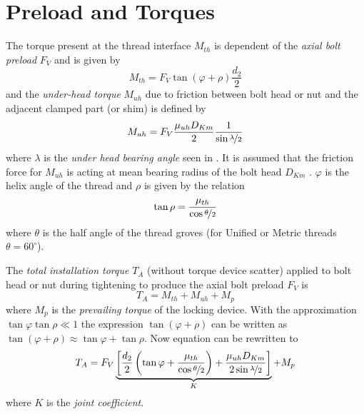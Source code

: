 \section{Preload and Torques}
\label{sec:preload}
The torque present at the thread interface $M_{th}$ is dependent of the \emph{axial bolt preload} $F_V$ 
and is given by
\begin{equation}
  M_{th} = F_V \tan(\varphi+\rho)\frac{d_2}{2}
  \label{equ:M_th}
\end{equation}
and the \emph{under-head torque} $M_{uh}$ due to friction between bolt head or nut and the adjacent 
clamped part (or shim) is defined by
\begin{equation}
  M_{uh} = F_V \frac{\mu_{uh} D_{Km}}{2} \frac{1}{\sin{\nicefrac{\lambda}{2}}}
  \label{equ:Muh}
\end{equation}
where $\lambda$ is the \emph{under head bearing angle} seen in .
It is assumed that the friction force for $M_{uh}$ is acting at mean bearing radius of the bolt head 
$D_{Km}$ . $\varphi$ is the helix angle of the thread and $\rho$ is given by the relation
\begin{equation}
  \tan\rho = \frac{\mu_{th}}{\cos\nicefrac{\theta}{2}}
\end{equation}
where $\theta$ is the half angle of the thread groves (for Unified or Metric threads $\theta=60^\circ$).

The \emph{total installation torque} $T_A$ (without torque device scatter) applied to bolt head or nut
during tightening to produce the axial bolt preload $F_V$ is 
\begin{equation}
  T_A = M_{th} + M_{uh} + M_p
  \label{equ:TA}
\end{equation}
where $M_p$ is the \emph{prevailing torque} of the locking device. 
With the approximation $\tan\varphi \tan\rho \ll 1$ the expression $\tan(\varphi+\rho)$ can be written
as $\tan(\varphi+\rho) \approx \tan\varphi + \tan\rho$. Now equation  can be rewritten to
\begin{equation}
  T_A = F_V \underbrace{ \left[ \frac{d_2}{2} \left( \tan\varphi + \frac{\mu_{th}}{\cos\nicefrac{\theta}{2}} \right) 
  + \frac{\mu_{uh} D_{Km}}{2 \sin\nicefrac{\lambda}{2}} \right]}_{K} + M_p
  \label{equ:TA2}
\end{equation}
where $K$ is the \emph{joint coefficient}.

